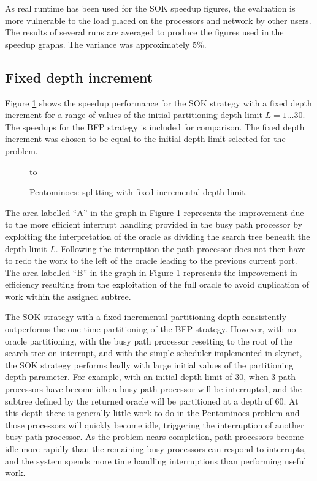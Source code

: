 As real runtime has been used for the SOK speedup figures, the evaluation is
more vulnerable to the load placed on the processors and network by other users.
The results of several runs are averaged to produce the figures used in the
speedup graphs.  The variance was approximately 5\%.

\subsection{Fixed depth increment}

Figure \ref{spd_compare_fixed} shows the speedup performance for the SOK strategy
with a fixed depth increment
for a range of values of the initial partitioning depth limit $L=1\ldots 30$.  The
speedups for the BFP strategy is included for comparison.  The fixed depth increment
was chosen to be equal to the initial depth limit selected for the problem.

\begin{figure}[htb]
\vspace{20mm} \hbox to 
\caption{Pentominoes: splitting with fixed incremental depth limit.}
\vspace{5mm}
\label{spd_compare_fixed}
\end{figure}

The area labelled ``A'' in the graph in Figure \ref{spd_compare_fixed}
represents the improvement due to the more
efficient interrupt handling provided in the busy path processor by exploiting the
interpretation of the oracle as dividing the search tree beneath the depth limit
$L$.  Following the interruption the path processor does not then have to redo the
work to the left of the oracle leading to the previous current port.  The area
labelled ``B'' in the graph in Figure \ref{spd_compare_fixed} represents the 
improvement in efficiency resulting from the exploitation of the full oracle to
avoid duplication of work within the assigned subtree.

The SOK strategy with a fixed incremental partitioning depth consistently
outperforms the one-time partitioning of the BFP strategy.  However, with no oracle
partitioning, with the busy path processor resetting to the root of the
search tree on interrupt, and with the simple scheduler implemented in skynet,
the SOK strategy performs badly with large initial values of the partitioning depth
parameter.  For example, with an initial depth limit of 30,
when 3 path processors have become idle a busy path processor will be interrupted,
and the subtree defined by the returned oracle will be partitioned at a depth
of 60.  At this depth there is generally little work to do in the Pentominoes
problem and those processors will quickly become idle, triggering the
interruption of another busy path processor.  As the problem nears completion, path
processors become idle more rapidly than the remaining busy processors can
respond to interrupts, and the system spends more time handling interruptions than
performing useful work. 

